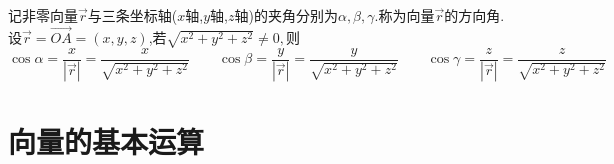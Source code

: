 \newpage 
{}
\quad 记非零向量$\overrightarrow{r}$与三条坐标轴($x$轴,$y$轴,$z$轴)的夹角分别为$\alpha ,\beta ,\gamma$.称为向量$\overrightarrow{r}$的方向角.设$\overrightarrow{r}=\overrightarrow{OA}=(x,y,z)$,若$\sqrt{x^2+y^2+z^2}\ne 0,$则
\begin{equation*}
	\cos \alpha =\frac{x}{|\overrightarrow{r}|}=\frac{x}{	\sqrt{x^2+y^2+z^2}}\qquad 
	\cos \beta =\frac{y}{|\overrightarrow{r}|}=\frac{y}{	\sqrt{x^2+y^2+z^2}}\qquad
	\cos \gamma =\frac{z}{|\overrightarrow{r}|}=\frac{z}{	\sqrt{x^2+y^2+z^2}}
\end{equation*}

\section{向量的基本运算}
